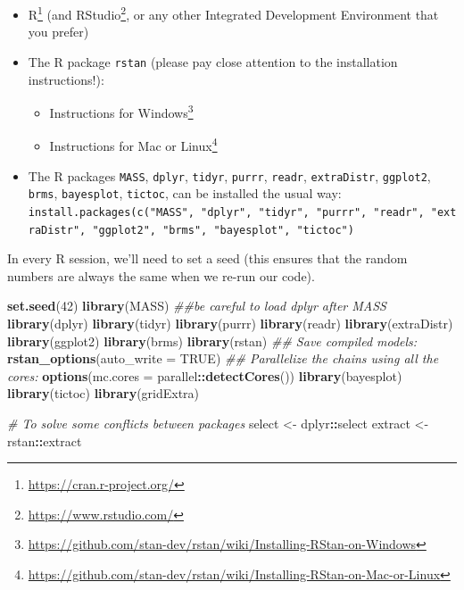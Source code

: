 \documentclass[12pt,]{krantz}
\newenvironment{Shaded}{\begin{snugshade}}{\end{snugshade}}
\newcommand{\CommentTok}[1]{\textcolor[rgb]{0.56,0.35,0.01}{\textit{#1}}}
\newcommand{\DataTypeTok}[1]{\textcolor[rgb]{0.13,0.29,0.53}{#1}}
\newcommand{\DecValTok}[1]{\textcolor[rgb]{0.00,0.00,0.81}{#1}}
\newcommand{\KeywordTok}[1]{\textcolor[rgb]{0.13,0.29,0.53}{\textbf{#1}}}
\newcommand{\NormalTok}[1]{#1}
\newcommand{\OperatorTok}[1]{\textcolor[rgb]{0.81,0.36,0.00}{\textbf{#1}}}
\newcommand{\OtherTok}[1]{\textcolor[rgb]{0.56,0.35,0.01}{#1}}
\newcommand{\StringTok}[1]{\textcolor[rgb]{0.31,0.60,0.02}{#1}}
\providecommand{\tightlist}{%
  \setlength{\itemsep}{0pt}\setlength{\parskip}{0pt}}
\renewcommand{\href}[2]{#2\footnote{\url{#1}}}
\theoremstyle{definition}
\theoremstyle{definition}
\theoremstyle{definition}
\theoremstyle{remark}
\begin{document}
\begin{itemize}
\tightlist
\item
  \href{https://cran.r-project.org/}{R} (and \href{https://www.rstudio.com/}{RStudio}, or any other Integrated Development Environment that you prefer)
\item
  The R package \texttt{rstan} (please pay close attention to the installation instructions!):

  \begin{itemize}
  \tightlist
  \item
    \href{https://github.com/stan-dev/rstan/wiki/Installing-RStan-on-Windows}{Instructions for Windows}
  \item
    \href{https://github.com/stan-dev/rstan/wiki/Installing-RStan-on-Mac-or-Linux}{Instructions for Mac or Linux}
  \end{itemize}
\item
  The R packages \texttt{MASS}, \texttt{dplyr}, \texttt{tidyr}, \texttt{purrr}, \texttt{readr}, \texttt{extraDistr}, \texttt{ggplot2}, \texttt{brms}, \texttt{bayesplot}, \texttt{tictoc}, can be installed the usual way: \texttt{install.packages(c("MASS",\ "dplyr",\ "tidyr",\ "purrr",\ "readr",\ "extraDistr",\ "ggplot2",\ "brms",\ "bayesplot",\ "tictoc")}
\end{itemize}

In every R session, we'll need to set a seed (this ensures that the random numbers are always the same when we re-run our code).

\begin{Shaded}
\begin{Highlighting}[]
\KeywordTok{set.seed}\NormalTok{(}\DecValTok{42}\NormalTok{)}
\KeywordTok{library}\NormalTok{(MASS)}
\CommentTok{##be careful to load dplyr after MASS}
\KeywordTok{library}\NormalTok{(dplyr)}
\KeywordTok{library}\NormalTok{(tidyr)}
\KeywordTok{library}\NormalTok{(purrr)}
\KeywordTok{library}\NormalTok{(readr)}
\KeywordTok{library}\NormalTok{(extraDistr)}
\KeywordTok{library}\NormalTok{(ggplot2)}
\KeywordTok{library}\NormalTok{(brms)}
\KeywordTok{library}\NormalTok{(rstan)}
\CommentTok{## Save compiled models:}
\KeywordTok{rstan_options}\NormalTok{(}\DataTypeTok{auto_write =} \OtherTok{TRUE}\NormalTok{)}
\CommentTok{## Parallelize the chains using all the cores:}
\KeywordTok{options}\NormalTok{(}\DataTypeTok{mc.cores =}\NormalTok{ parallel}\OperatorTok{::}\KeywordTok{detectCores}\NormalTok{())}
\KeywordTok{library}\NormalTok{(bayesplot)}
\KeywordTok{library}\NormalTok{(tictoc)}
\KeywordTok{library}\NormalTok{(gridExtra)}


\CommentTok{# To solve some conflicts between  packages}
\NormalTok{select <-}\StringTok{ }\NormalTok{dplyr}\OperatorTok{::}\NormalTok{select}
\NormalTok{extract <-}\StringTok{ }\NormalTok{rstan}\OperatorTok{::}\NormalTok{extract}
\end{Highlighting}
\end{Shaded}
\end{document}

